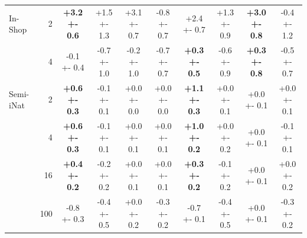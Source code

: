 \begin{table}[tbp]
\begin{tabular}{@{}l r@{\hspace{6pt}} *{8}{S[table-format=+1.1(2), retain-explicit-plus, retain-zero-uncertainty]}@{}}
\addlinespace
In-Shop & 2 & \bfseries +3.2 +- 0.6 & +1.5 +- 1.3 & +3.1 +- 0.7 & -0.8 +- 0.7 & +2.4 +- 0.7 & +1.3 +- 0.9 & \bfseries +3.0 +- 0.8 & -0.4 +- 1.2 \\
 & 4 & -0.1 +- 0.4 & -0.7 +- 1.0 & -0.2 +- 1.0 & -0.7 +- 0.7 & \bfseries +0.3 +- 0.5 & -0.6 +- 0.9 & \bfseries +0.3 +- 0.8 & -0.5 +- 0.7 \\
\addlinespace
Semi-iNat & 2 & \bfseries +0.6 +- 0.3 & -0.1 +- 0.1 & +0.0 +- 0.0 & +0.0 +- 0.0 & \bfseries +1.1 +- 0.3 & +0.0 +- 0.1 & +0.0 +- 0.1 & +0.0 +- 0.1 \\
 & 4 & \bfseries +0.6 +- 0.3 & -0.1 +- 0.1 & +0.0 +- 0.1 & +0.0 +- 0.1 & \bfseries +1.0 +- 0.2 & +0.0 +- 0.2 & +0.0 +- 0.1 & -0.1 +- 0.1 \\
 & 16 & \bfseries +0.4 +- 0.2 & -0.2 +- 0.2 & +0.0 +- 0.1 & +0.0 +- 0.1 & \bfseries +0.3 +- 0.2 & -0.1 +- 0.2 & +0.0 +- 0.1 & +0.0 +- 0.2 \\
 & 100 & -0.8 +- 0.3 & -0.4 +- 0.5 & +0.0 +- 0.2 & -0.3 +- 0.2 & -0.7 +- 0.1 & -0.4 +- 0.5 & +0.0 +- 0.1 & -0.3 +- 0.2 \\
\bottomrule
\end{tabular}
\end{table}
